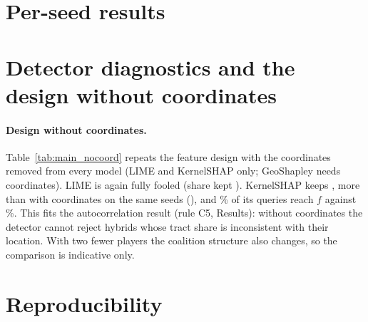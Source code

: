 \section{Per-seed results}

\section{Detector diagnostics and the design without coordinates}

\paragraph{Design without coordinates.} Table~\ref{tab:main_nocoord} repeats the feature design with the coordinates
removed from every model (LIME and KernelSHAP only; GeoShapley needs coordinates). LIME is again fully fooled (share
kept \NLIMEMatKept). KernelSHAP keeps \NKernelSHAPMatKept, more than with coordinates on the same seeds
(\MainKernelSHAPKeptLocalTab), and \NKernelSHAPMatLeak\% of its queries reach $f$ against
\MainKernelSHAPLeakLocalTab\%. This fits the autocorrelation result (rule C5,
Results): without coordinates the detector cannot reject hybrids whose tract share is
inconsistent with their location. With two fewer players the coalition structure also changes, so the comparison is
indicative only.


\section{Reproducibility}
